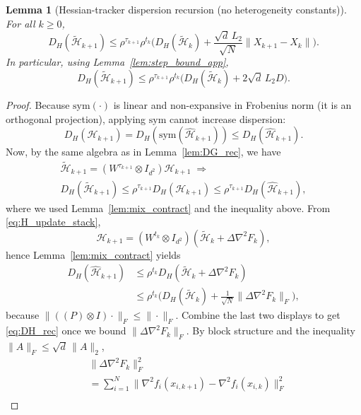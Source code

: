 \documentclass[10pt,twocolumn,letterpaper]{article}
\def\one{1}%
\def\J{J}%
\def\Pmat{P}%
\theoremstyle{compact}
\newtheorem{lemma}[theorem]{Lemma}
\theoremstyle{compactremark}
\newcommand{\one}{\mathbf{1}}
\newcommand{\J}{\left(\frac{1}{N}\one\one^\top\right)}
\newcommand{\Pmat}{I-\J}
\begin{document}
\begin{lemma}[Hessian-tracker dispersion recursion (no heterogeneity constants)]\label{lem:DH_rec}
For all $k\ge0$,
\begin{equation}\label{eq:DH_rec}
D_H(\tilde{\mathcal H}_{k+1})
\le \rho^{\tau_{k+1}}\rho^{t_k}\Big(D_H(\tilde{\mathcal H}_k)+\frac{\sqrt d\,L_2}{\sqrt N}\|X_{k+1}-X_k\|\Big).
\end{equation}
In particular, using Lemma~\ref{lem:step_bound_app},
\begin{equation}\label{eq:DH_rec_const}
D_H(\tilde{\mathcal H}_{k+1})
\le \rho^{\tau_{k+1}}\rho^{t_k}\Big(D_H(\tilde{\mathcal H}_k)+2\sqrt d\,L_2D\Big).
\end{equation}
\end{lemma}
\begin{proof}
Because $\mathrm{sym}(\cdot)$ is linear and non-expansive in Frobenius norm (it is an orthogonal projection),
applying $\mathrm{sym}$ cannot increase dispersion:
\[
D_H(\mathcal H_{k+1})=D_H(\mathrm{sym}(\widehat{\mathcal H}_{k+1}))\le D_H(\widehat{\mathcal H}_{k+1}).
\]
Now, by the same algebra as in Lemma~\ref{lem:DG_rec}, we have
\begin{gather*}
\tilde{\mathcal H}_{k+1}
=(W^{\tau_{k+1}}\!\otimes\! I_{d^2})\mathcal H_{k+1}\;\Rightarrow\\
D_H(\tilde{\mathcal H}_{k+1})\le \rho^{\tau_{k+1}}D_H(\mathcal H_{k+1})
\le \rho^{\tau_{k+1}}D_H(\widehat{\mathcal H}_{k+1}),
\end{gather*}
where we used Lemma~\ref{lem:mix_contract} and the inequality above.
From \eqref{eq:H_update_stack},
\[
\widehat{\mathcal H}_{k+1}\!=\!(W^{t_k}\!\otimes\! I_{d^2})(\tilde{\mathcal H}_k\!+\!\Delta\nabla^2 F_k),
\]
hence Lemma~\ref{lem:mix_contract} yields
\begin{align*}
D_H(\widehat{\mathcal H}_{k+1})
&\le \rho^{t_k}D_H(\tilde{\mathcal H}_k\!+\!\Delta\nabla^2 F_k)\\
&\le \rho^{t_k}\!\Big(D_H(\tilde{\mathcal H}_k)\!+\!\tfrac1{\sqrt N}\|\Delta\nabla^2 F_k\|_F\Big),
\end{align*}
because $\|((\Pmat)\otimes I)\cdot\|_F\le \|\cdot\|_F$.
Combine the last two displays to get \eqref{eq:DH_rec} once we bound $\|\Delta\nabla^2F_k\|_F$.
By block structure and the inequality $\|A\|_F\le \sqrt d\,\|A\|_2$,
\begin{align*}
&\|\Delta\nabla^2 F_k\|_F^2\\
&=\textstyle\sum_{i=1}^N\|\nabla^2 f_i(x_{i,k+1})\!-\!\nabla^2 f_i(x_{i,k})\|_F^2\\

\end{align*}
\end{proof}
\end{document}

